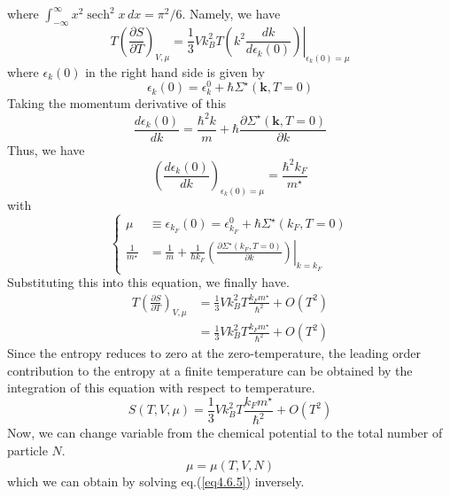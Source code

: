 where $\int_{-\infty}^\infty x^2\operatorname{sech}^2x\,dx=\pi^2/6$.
 Namely, we have
\begin{equation}
T\left( \frac{\partial S}{\partial T} \right)_{V,\mu}=\frac{1}{3}V k_B^2 T \left. \left( k^2 \frac{dk}{d\epsilon_k(0)} \right) \right|_{\epsilon_k(0)=\mu} 
\end{equation}
where $\epsilon_k(0)$ in the right hand side is given by
\begin{equation}\tag{4.6.25'}
\epsilon_k(0)=\epsilon_k^0 +\hbar\Sigma ^\star (\mathbf{k},T=0)
\end{equation}
 Taking the momentum derivative of this
\begin{equation}
\frac{d\epsilon_k(0)}{dk}=\frac{\hbar^2 k}{m}+\hbar \frac{\partial \Sigma ^\star (\mathbf{k},T=0)}{\partial k}
\end{equation}
 Thus, we have
\begin{equation}
\left(\frac{d\epsilon_k(0)}{dk}\right)_{\epsilon_k(0)=\mu} =\frac{\hbar^2 k_F}{m^\star}
\end{equation}
with
\begin{equation}
\left\{
\begin{aligned}
\mu&\equiv \epsilon_{k_F}(0)=\epsilon_{k_F}^0 +\hbar \Sigma^\star(k_F,T=0)\\
\frac{1}{m^\star} &=\frac{1}{m} +\frac{1}{\hbar k_F}\left. \left( \frac{\partial \Sigma^\star(k_F,T=0)}{\partial k} \right)\right|_{k=k_F}
\end{aligned}
\right.
\end{equation}
 Substituting this into this equation, we finally have.
\begin{equation}
\begin{aligned}
T\left( \frac{\partial S}{\partial T} \right)_{V,\mu}&=\frac{1}{3}V k_B^2 T \frac{k_F m^\star}{\hbar^2} +O(T^2)\\
&=\frac{1}{3}V k_B^2 T \frac{k_F m^\star}{\hbar^2}+O(T^2)
\end{aligned}
\end{equation}
 Since the entropy reduces to zero at the zero-temperature, the leading order contribution to the entropy at a finite temperature can be obtained by the integration of this equation with respect to temperature.
\begin{equation}
S(T,V,\mu)=\frac{1}{3}V k_B^2 T \frac{k_F m^\star}{\hbar^2}+O(T^2)
\end{equation}
 Now, we can change variable from the chemical potential to the total number of particle $N$.
\[
\mu=\mu(T,V,N)
\]
 which we can obtain by solving eq.(\ref{eq4.6.5}) inversely.

